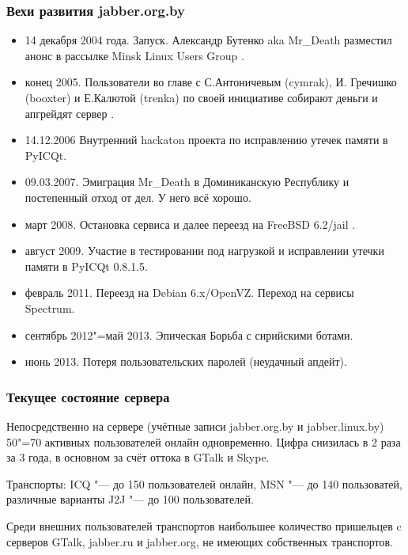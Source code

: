 \documentclass[10pt, a5paper]{article}
\begin{document}
\subsubsection*{Вехи развития jabber.org.by}

\begin{itemize}
  \item 14 декабря 2004 года. Запуск. Александр Бутенко aka Mr\_Death разместил анонс в рассылке Minsk Linux Users Group \cite{Mendoza5}.
  \item конец 2005. Пользователи во главе с С.Антоничевым (cymrak), И. Гречишко (booxter)  и Е.Калютой (trenka) по своей инициативе собирают деньги и апгрейдят сервер \cite{Mendoza6}.
  \item 14.12.2006 Внутренний hackaton проекта по исправлению утечек памяти в PyICQt.
  \item 09.03.2007. Эмиграция Mr\_Death в Доминиканскую Республику и постепенный отход от дел. У него всё хорошо.
  \item март 2008. Остановка сервиса и далее переезд на FreeBSD 6.2/jail \cite{Mendoza7}.
  \item август 2009. Участие в тестировании под нагрузкой и исправлении утечки памяти в PyICQt 0.8.1.5.
  \item февраль 2011. Переезд на Debian 6.x/OpenVZ. Переход на сервисы Spectrum.
  \item сентябрь 2012"=май 2013. Эпическая Борьба с сирийскими ботами.
  \item июнь 2013. Потеря пользовательских паролей (неудачный апдейт).
\end{itemize}

\subsubsection*{Текущее состояние сервера}

Непосредственно на сервере (учётные записи jabber.org.by и \linebreak jabber.linux.by) 50"=70 активных пользователей онлайн одновременно. Цифра снизилась в 2 раза за 3 года, в основном за счёт оттока в GTalk и Skype.

Транспорты: ICQ "--- до 150 пользователей онлайн, MSN "--- до 140 пользоватей, различные варианты J2J "--- до 100 пользователей.

Среди внешних пользователей транспортов наибольшее количество пришельцев  c серверов GTalk, jabber.ru и jabber.org, не имеющих собственных транспортов.
\end{document}
